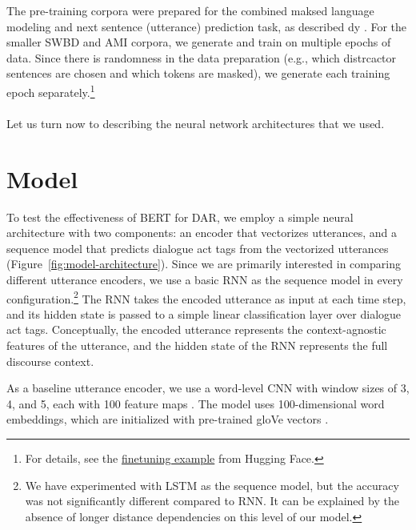 \documentclass[11pt,a4paper]{article}
\begin{document}
The pre-training corpora were prepared for the combined maksed language modeling and next sentence (utterance) prediction task, as described dy \citet{devlinBERTPretrainingDeep2018}.
For the smaller SWBD and AMI corpora, we generate and train on multiple epochs of data. Since there is randomness in the data preparation (e.g., which distrcactor sentences are chosen and which tokens are masked), we generate each training epoch separately.\footnote{For details, see the \href{https://github.com/huggingface/transformers/tree/1.1.0/examples/lm_finetuning}{finetuning example} from Hugging Face.}

\paragraph{}
Let us turn now to describing the neural network architectures that we used.
  
\section{Model} %

To test the effectiveness of BERT for DAR, we employ a simple neural architecture with two components: an encoder that vectorizes utterances, and a sequence model that predicts dialogue act tags from the vectorized utterances (Figure~\ref{fig:model-architecture}).
Since we are primarily interested in comparing different utterance encoders, we use a basic RNN as the sequence model in every configuration.\footnote{We have experimented with LSTM as the sequence model, but the accuracy was not significantly different compared to RNN. It can be explained by the absence of longer distance dependencies on this level of our model.} 
The RNN takes the encoded utterance as input at each time step,
and its hidden state is passed to a simple linear classification layer over dialogue act tags.
Conceptually, the encoded utterance represents the context-agnostic features of the utterance, and the hidden state of the RNN represents the full discourse context.

\begin{figure*}
  
  \caption{Simple neural dialogue act recognition sequence model}
  \label{fig:model-architecture}
\end{figure*}

As a baseline utterance encoder, we use a word-level CNN with window sizes of 3, 4, and 5, each with 100 feature maps \citep{kimConvolutionalNeuralNetworks2014}. 
The model uses 100-dimensional word embeddings, which are initialized with pre-trained gloVe vectors \citep{penningtonGloveGlobalVectors2014}.
\end{document}
